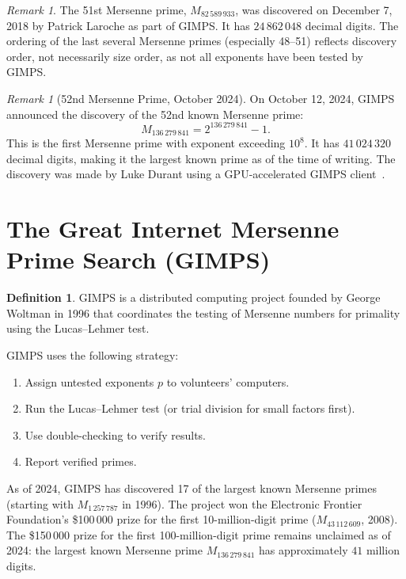 \documentclass[12pt,a4paper]{amsart}
\theoremstyle{definition}
\newtheorem{definition}[theorem]{Definition}
\theoremstyle{remark}
\newtheorem{remark}[theorem]{Remark}
\begin{document}
\begin{remark}
The 51st Mersenne prime, $M_{82\,589\,933}$, was discovered on December 7, 2018
by Patrick Laroche as part of GIMPS.
It has $24\,862\,048$ decimal digits.
The ordering of the last several Mersenne primes (especially 48--51) reflects
discovery order, not necessarily size order, as not all exponents have been
tested by GIMPS.
\end{remark}

\begin{remark}[52nd Mersenne Prime, October 2024]
\label{rem:52nd}
On October 12, 2024, GIMPS announced the discovery of the 52nd known Mersenne
prime:
\[
    M_{136\,279\,841} = 2^{136\,279\,841} - 1.
\]
This is the first Mersenne prime with exponent exceeding $10^8$.  It has
$41\,024\,320$ decimal digits, making it the largest known prime as of the
time of writing.  The discovery was made by Luke Durant using a GPU-accelerated
GIMPS client~\cite{GIMPS2024b}.
\end{remark}

\section{The Great Internet Mersenne Prime Search (GIMPS)}

\begin{definition}
GIMPS is a distributed computing project founded by George Woltman in 1996
that coordinates the testing of Mersenne numbers for primality using the
Lucas--Lehmer test.
\end{definition}

GIMPS uses the following strategy:
\begin{enumerate}[label=(\arabic*)]
  \item Assign untested exponents $p$ to volunteers' computers.
  \item Run the Lucas--Lehmer test (or trial division for small factors first).
  \item Use double-checking to verify results.
  \item Report verified primes.
\end{enumerate}

As of 2024, GIMPS has discovered 17 of the largest known Mersenne primes
(starting with $M_{1\,257\,787}$ in 1996).
The project won the Electronic Frontier Foundation's \$100\,000 prize for the
first 10-million-digit prime ($M_{43\,112\,609}$, 2008).
The \$150\,000 prize for the first 100-million-digit prime remains unclaimed
as of 2024: the largest known Mersenne prime $M_{136\,279\,841}$ has
approximately $41$ million digits.
\end{document}
